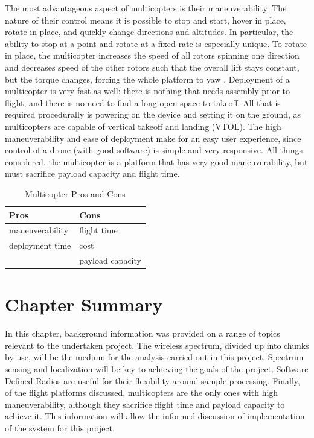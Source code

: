 The most advantageous aspect of multicopters is their maneuverability. The nature of their control means it is possible to stop and start, hover in place, rotate in place, and quickly change directions and altitudes. In particular, the ability to stop at a point and rotate at a fixed rate is especially unique. To rotate in place, the multicopter increases the speed of all rotors spinning one direction and decreases speed of the other rotors such that the overall lift stays constant, but the torque changes, forcing the whole platform to yaw \cite{multicopter_dynamics}. Deployment of a multicopter is very fast as well: there is nothing that needs assembly prior to flight, and there is no need to find a long open space to takeoff. All that is required procedurally  is powering on the device and setting it on the ground, as multicopters are capable of vertical takeoff and landing (VTOL). The high maneuverability and ease of deployment make for an easy user experience, since control of a drone (with good software) is simple and very responsive. All things considered, the multicopter is a platform that has very good maneuverability, but must sacrifice payload capacity and flight time.
\begin{table}[ht]
\centering
\caption{Multicopter Pros and Cons}
\label{table:multi_pc}
\begin{tabular}{l|l}
  Pros & Cons \\ \hline
  maneuverability & flight time \\
  deployment time & cost \\
   & payload capacity \\
\end{tabular}
\end{table}\par

\section{Chapter Summary}
In this chapter, background information was provided on a range of topics relevant to the undertaken project. The wireless spectrum, divided up into chunks by use, will be the medium for the analysis carried out in this project. Spectrum sensing and localization will be key to achieving the goals of the project. Software Defined Radios are useful for their flexibility around sample processing. Finally, of the flight platforms discussed, multicopters are the only ones with high maneuverability, although they sacrifice flight time and payload capacity to achieve it. This information will allow the informed discussion of implementation of the system for this project.
